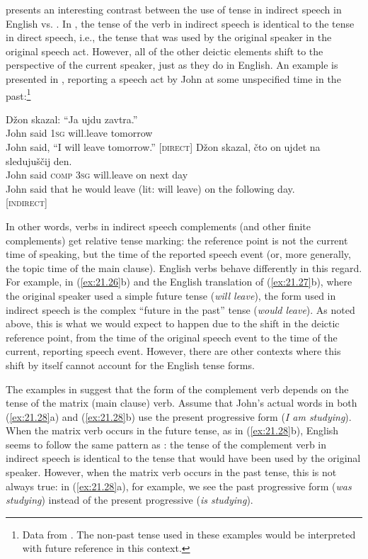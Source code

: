 \citet{Comrie1985} presents an interesting contrast between the use of tense in indirect speech in English vs. . In , the tense of the verb in indirect speech is identical to the tense in direct speech, i.e., the tense that was used by the original speaker in the original speech act. However, all of the other deictic elements shift to the perspective of the current speaker, just as they do in English. An example is presented in , reporting a speech act by John at some unspecified time in the past:\footnote{Data from \citet[109]{Comrie1985}. The non-past tense used in these examples would be interpreted with future reference in this context.}


\ea \label{ex:21.27}
\ea  
\gll Džon  skazal:  “Ja  ujdu  zavtra.”\\
John  said  \textsc{1sg}  will.leave  tomorrow\\
\glt John said, “I will leave tomorrow.” \hfill  [\textsc{direct}]
\ex 
\gll Džon  skazal,  čto  on  ujdet  na  sledujuščij  den.\\
John  said  \textsc{comp}  \textsc{3sg}  will.leave  on  next  day\\
\glt John said that he would leave (lit: will leave) on the following day. \\
\hfill  [\textsc{indirect}]
\z \z

\largerpage
In other words, verbs in  indirect speech complements (and other finite complements) get relative tense marking: the reference point is not the current time of speaking, but the time of the reported speech event (or, more generally, the topic time of the main clause). English verbs behave differently in this regard. For example, in (\ref{ex:21.26}b) and the English translation of (\ref{ex:21.27}b), where the original speaker used a simple future tense (\textit{will leave}), the form used in indirect speech is the complex “future in the past” tense (\textit{would leave}). As noted above, this is what we would expect to happen due to the shift in the deictic reference point, from the time of the original speech event to the time of the current, reporting speech event. However, there are other contexts where this shift by itself cannot account for the English tense forms.



The examples in  suggest that the form of the complement verb depends on the tense of the matrix (main clause) verb. Assume that John’s actual words in both (\ref{ex:21.28}a) and (\ref{ex:21.28}b) use the present progressive form (\textit{I am studying}). When the matrix verb occurs in the future tense, as in (\ref{ex:21.28}b), English seems to follow the same pattern as : the tense of the complement verb in indirect speech is identical to the tense that would have been used by the original speaker. However, when the matrix verb occurs in the past tense, this is not always true: in (\ref{ex:21.28}a), for example, we see the past progressive form (\textit{was studying}) instead of the present progressive (\textit{is studying}).


